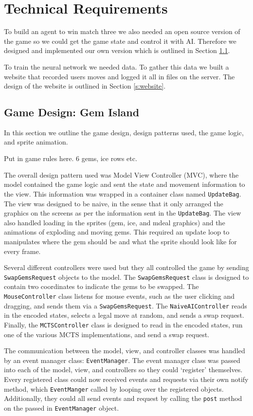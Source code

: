 \documentclass{bhamthesis}
\theoremstyle{definition}
\begin{document}
\chapter{Technical Requirements}
To build an agent to win match three we also needed an open source version of the game so we could get the game state and control it with AI. Therefore we designed and implemented our own version which is outlined in Section \ref{s:gamed}. 

To train the neural network we needed data. To gather this data we built a website that recorded users moves and logged it all in files on the server. The design of the website is outlined in Section \ref{s:website}.

\section{Game Design: Gem Island}\label{s:gamed}
In this section we outline the game design, design patterns used, the game logic, and sprite animation.

Put in game rules here. 6 gems, ice rows etc.

The overall design pattern used was Model View Controller (MVC), where the model contained the game logic and sent the state and movement information to the view. This information was wrapped in a container class named \verb|UpdateBag|. The view was designed to be naive, in the sense that it only arranged the graphics on the screens as per the information sent in the \verb|UpdateBag|. The view also handled loading in the sprites (gem, ice, and mdeal graphics) and the animations of exploding and moving gems. This required an update loop to manipulates where the gem should be and what the sprite should look like for every frame. 

Several different controllers were used but they all controlled the game by sending \verb|SwapGemsRequest| objects to the model. The \verb|SwapGemsRequest| class is designed to contain two coordinates to indicate the gems to be swapped. The \verb|MouseController| class listens for mouse events, such as the user clicking and dragging, and sends them via a \verb|SwapGemsRequest|. The \verb|NaiveAIController| reads in the encoded states, selects a legal move at random, and sends a swap request.
Finally, the \verb|MCTSController| class is designed to read in the encoded states, run one of the various MCTS implementations, and send a swap request.

The communication between the model, view, and controller classes was handled by an event manager class: \verb|EventManager|. The event manager class was passed into each of the model, view, and controllers so they could `register' themselves. Every registered class could now received events and requests via their own notify method, which \verb|EventManger| called by looping over the registered objects. Additionally, they could all send events and request by calling the \verb|post| method on the passed in \verb|EventManager| object.
\end{document}
